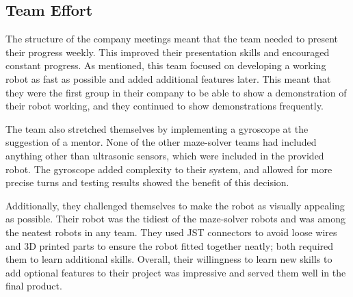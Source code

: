    \subsection{Team Effort}\label{subsec:technical-effort}
        The structure of the company meetings meant that the team needed to present their progress weekly.
        This improved their presentation skills and encouraged constant progress.
        As mentioned, this team focused on developing a working robot as fast as possible and added additional features later.
        This meant that they were the first group in their company to be able to show a demonstration of their robot working, and they continued to show demonstrations frequently.

        The team also stretched themselves by implementing a gyroscope at the suggestion of a mentor.
        None of the other maze-solver teams had included anything other than ultrasonic sensors, which were included in the provided robot.
        The gyroscope added complexity to their system, and allowed for more precise turns and testing results showed the benefit of this decision.

        Additionally, they challenged themselves to make the robot as visually appealing as possible.
        Their robot was the tidiest of the maze-solver robots and was among the neatest robots in any team.
        They used JST connectors to avoid loose wires and 3D printed parts to ensure the robot fitted together neatly;
        both required them to learn additional skills.
        Overall, their willingness to learn new skills to add optional features to their project was impressive and served them well in the final product.

